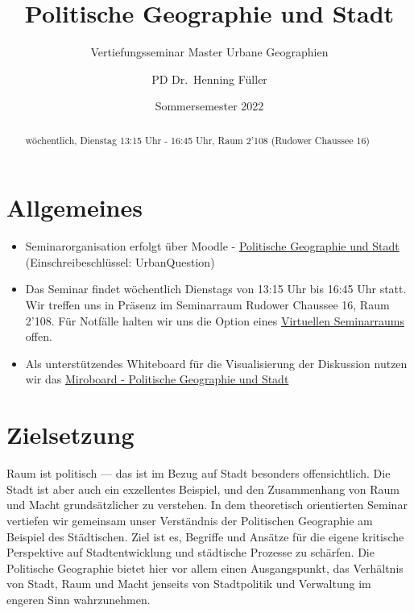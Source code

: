 \documentclass[
  ngerman,
]{article}
\title{Politische Geographie und Stadt}
\subtitle{Vertiefungsseminar Master Urbane Geographien}
\author{PD Dr.~Henning Füller}
\date{Sommersemester 2022}
\begin{document}
\maketitle
\begin{abstract}
wöchentlich, Dienstag 13:15 Uhr - 16:45 Uhr, Raum 2'108 (Rudower Chaussee 16)
\end{abstract}

{
\hypersetup{linkcolor=}
\setcounter{tocdepth}{2}
\tableofcontents
}
\hypertarget{allgemeines}{%
\section*{Allgemeines}\label{allgemeines}}

\begin{itemize}
\item
  Seminarorganisation erfolgt über Moodle - \href{https://moodle.hu-berlin.de/course/view.php?id=110334\#}{Politische Geographie und Stadt} (Einschreibeschlüssel: UrbanQuestion)
\item
  Das Seminar findet wöchentlich Dienstags von 13:15 Uhr bis 16:45 Uhr statt. Wir treffen uns in Präsenz im Seminarraum Rudower Chaussee 16, Raum 2'108. Für Notfälle halten wir uns die Option eines \href{https://moodle.hu-berlin.de/mod/zoom/view.php?id=2822640\&forceview=1}{Virtuellen Seminarraums} offen.
\item
  Als unterstützendes Whiteboard für die Visualisierung der Diskussion nutzen wir das \href{https://miro.com/app/board/uXjVO938_ew=/?share_link_id=791375936145}{Miroboard - Politische Geographie und Stadt}
\end{itemize}

\hypertarget{zielsetzung}{%
\section*{Zielsetzung}\label{zielsetzung}}

Raum ist politisch --- das ist im Bezug auf Stadt besonders offensichtlich. Die Stadt ist aber auch ein exzellentes Beispiel, und den Zusammenhang von Raum und Macht grundsätzlicher zu verstehen. In dem theoretisch orientierten Seminar vertiefen wir gemeinsam unser Verständnis der Politischen Geographie am Beispiel des Städtischen. Ziel ist es, Begriffe und Ansätze für die eigene kritische Perspektive auf Stadtentwicklung und städtische Prozesse zu schärfen. Die Politische Geographie bietet hier vor allem einen Ausgangspunkt, das Verhältnis von Stadt, Raum und Macht jenseits von Stadtpolitik und Verwaltung im engeren Sinn wahrzunehmen.
\end{document}

